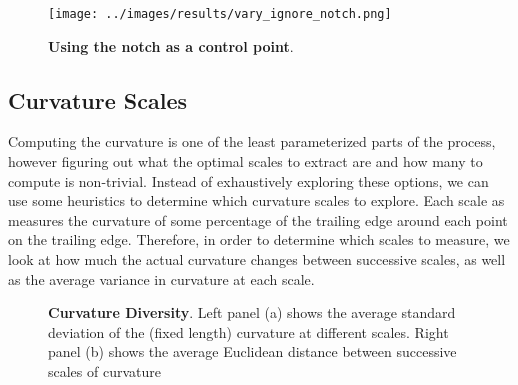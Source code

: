 \begin{figure}[t]%
\centering
\texttt{[image: ../images/results/vary\_ignore\_notch.png]}
\caption{\textbf{Using the notch as a control point}.}
\label{fig:vary_notch}
\end{figure}

\subsection{Curvature Scales}

Computing the curvature is one of the least parameterized parts of the process, however figuring out what the optimal scales to extract are and how many to compute is non-trivial.
Instead of exhaustively exploring these options, we can use some heuristics to determine which curvature scales to explore.
Each scale as measures the curvature of some percentage of the trailing edge around each point on the trailing edge.
Therefore, in order to determine which scales to measure, we look at how much the actual curvature changes between successive scales, as well as the average variance in curvature at each scale. 

\begin{figure}[t]%
\centering
{}
%
\caption{\textbf{Curvature Diversity}. Left panel (a) shows the average standard deviation of the (fixed length) curvature at different scales. Right panel (b) shows the average Euclidean distance between successive scales of curvature}
\label{fig:curvature_diversity}
\end{figure}

